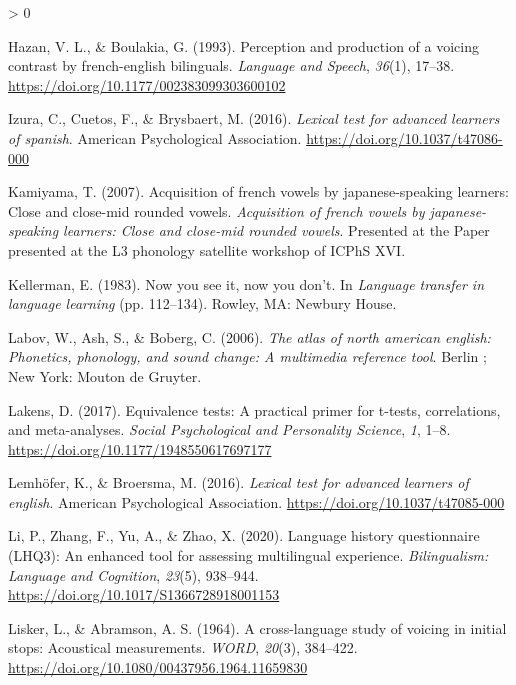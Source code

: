 \documentclass[
  english,
  man]{apa6}
\newlength{\cslhangindent}
\newenvironment{CSLReferences}[2] %
 {%
  \setlength{\parindent}{0pt}
  \ifodd #1 \everypar{\setlength{\hangindent}{\cslhangindent}}\ignorespaces\fi
  \ifnum #2 > 0
  \setlength{\parskip}{#2\baselineskip}
  \fi
 }%
 {}
\begin{document}
\begin{CSLReferences}{1}{0}
\leavevmode\hypertarget{ref-hazan_perception_1993}{}%
Hazan, V. L., \& Boulakia, G. (1993). Perception and production of a voicing contrast by french-english bilinguals. \emph{Language and Speech}, \emph{36}(1), 17--38. \url{https://doi.org/10.1177/002383099303600102}

\leavevmode\hypertarget{ref-izura_lexical_2016}{}%
Izura, C., Cuetos, F., \& Brysbaert, M. (2016). \emph{Lexical test for advanced learners of spanish}. American Psychological Association. \url{https://doi.org/10.1037/t47086-000}

\leavevmode\hypertarget{ref-kamiyama_acquisition_2007}{}%
Kamiyama, T. (2007). Acquisition of french vowels by japanese-speaking learners: Close and close-mid rounded vowels. \emph{Acquisition of french vowels by japanese-speaking learners: Close and close-mid rounded vowels}. Presented at the Paper presented at the L3 phonology satellite workshop of {ICPhS} {XVI}.

\leavevmode\hypertarget{ref-kellerman_now_1983}{}%
Kellerman, E. (1983). Now you see it, now you don't. In \emph{Language transfer in language learning} (pp. 112--134). Rowley, {MA}: Newbury House.

\leavevmode\hypertarget{ref-labov_atlas_2006}{}%
Labov, W., Ash, S., \& Boberg, C. (2006). \emph{The atlas of north american english: Phonetics, phonology, and sound change: A multimedia reference tool}. Berlin ; New York: Mouton de Gruyter.

\leavevmode\hypertarget{ref-toster}{}%
Lakens, D. (2017). Equivalence tests: A practical primer for t-tests, correlations, and meta-analyses. \emph{Social Psychological and Personality Science}, \emph{1}, 1--8. \url{https://doi.org/10.1177/1948550617697177}

\leavevmode\hypertarget{ref-lemhofer_lexical_2016}{}%
Lemhöfer, K., \& Broersma, M. (2016). \emph{Lexical test for advanced learners of english}. American Psychological Association. \url{https://doi.org/10.1037/t47085-000}

\leavevmode\hypertarget{ref-li_language_2020}{}%
Li, P., Zhang, F., Yu, A., \& Zhao, X. (2020). Language history questionnaire ({LHQ}3): An enhanced tool for assessing multilingual experience. \emph{Bilingualism: Language and Cognition}, \emph{23}(5), 938--944. \url{https://doi.org/10.1017/S1366728918001153}

\leavevmode\hypertarget{ref-lisker_cross-language_1964}{}%
Lisker, L., \& Abramson, A. S. (1964). A cross-language study of voicing in initial stops: Acoustical measurements. \emph{\emph{WORD}}, \emph{20}(3), 384--422. \url{https://doi.org/10.1080/00437956.1964.11659830}


\end{CSLReferences}
\end{document}
